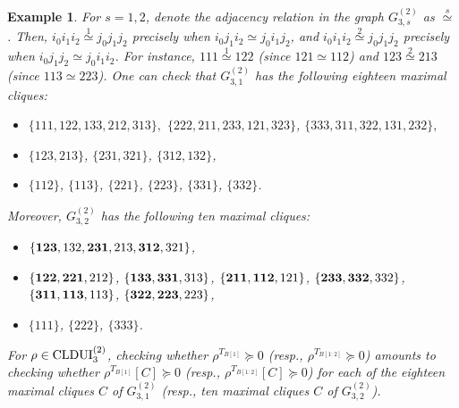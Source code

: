 \documentclass[11pt]{article}
\newcommand{\CLDUI}{\text{\rm CLDUI}}
\newcommand{\edge}{\stackrel{1}{\simeq}}
\newcommand{\edgetwo}{\stackrel{2}{\simeq}}
\theoremstyle{plain}
\newtheorem{example}[satz]{Example}
\begin{document}
{\begin{example}
For $s=1,2$, denote the adjacency relation in the   graph $G^{(2)}_{3,s}$ as $\stackrel{s}{\simeq}$. Then, $i_0i_1i_2 \edge j_0j_1j_2$ 
precisely when $i_0j_1i_2\simeq j_0i_1j_2$, and $i_0i_1i_2 \edgetwo j_0j_1j_2$ precisely when 
$i_0j_1j_2\simeq j_0i_1i_2$.
For instance, $111\edge 122$ (since $121\simeq 112$) and 
$123\edgetwo 213$ (since $113\simeq 223$). 
One can check that $G^{(2)}_{3,1}$ has  the  following eighteen maximal cliques:
\begin{itemize}
\item
$\{111, 122, 133, 212, 313\},$ 
$\{222, 211, 233, 121, 323\}$,
$\{333, 311, 322, 131, 232\},$
\item 
$\{123,213\}$, $\{231,321\}$, $\{312,132\}$,
\item $\{112\}$, $\{113\}$, $\{221\}$, $\{223\}$, $\{331\}$, $\{332\}$.
\end{itemize}
 Moreover, $G^{(2)}_{3,2}$ has the following ten maximal cliques:
 \begin{itemize}
 \item $\{{\bf 123}, 132, {\bf 231}, 213, {\bf 312}, 321\}$,
 \item $\{{\bf 122},{\bf 221},212\}$, $\{ {\bf 133}, {\bf 331}, 313\}$, $\{ {\bf 211}, {\bf 112}, 121\}$, $\{ {\bf 233}, {\bf 332}, 332\}$, $\{{\bf 311}, {\bf 113}, 113\}$, $\{ {\bf 322}, {\bf 223}, 223\}$,
 \item $\{111\}$, $\{222\}$, $\{333\}$.
 \end{itemize}
For  $\rho\in \CLDUI^{(2)}_3$, checking  whether $\rho^{T_{B[1]}}\succeq 0$ (resp., $\rho^{T_{B[1:2]}}\succeq 0$) amounts to checking whether  $\rho^{T_{B[1]}}[C]\succeq 0$ (resp., $\rho^{T_{B[1:2]}}[C]\succeq 0$) 
 for each of the eighteen maximal cliques $C$ of 
 $G^{(2)}_{3,1}$ (resp., ten maximal cliques $C$ of  $G^{(2)}_{3,2}$).
\end{example}
}
\end{document}
